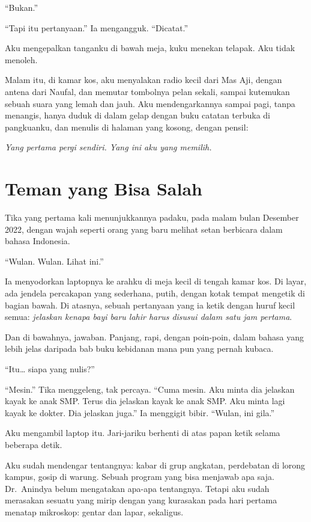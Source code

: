 \documentclass[11pt,twoside,openany]{book}
\begin{document}
``Bukan.''

``Tapi itu pertanyaan.'' Ia mengangguk. ``Dicatat.''

Aku mengepalkan tanganku di bawah meja, kuku menekan telapak. Aku tidak menoleh.

Malam itu, di kamar kos, aku menyalakan radio kecil dari Mas Aji, dengan antena dari Naufal, dan memutar tombolnya pelan sekali, sampai kutemukan sebuah suara yang lemah dan jauh. Aku mendengarkannya sampai pagi, tanpa menangis, hanya duduk di dalam gelap dengan buku catatan terbuka di pangkuanku, dan menulis di halaman yang kosong, dengan pensil:

\emph{Yang pertama pergi sendiri. Yang ini aku yang memilih.}

\chapter{Teman yang Bisa Salah}
Tika yang pertama kali menunjukkannya padaku, pada malam bulan Desember 2022, dengan wajah seperti orang yang baru melihat setan berbicara dalam bahasa Indonesia.

``Wulan. Wulan. Lihat ini.''

Ia menyodorkan laptopnya ke arahku di meja kecil di tengah kamar kos. Di layar, ada jendela percakapan yang sederhana, putih, dengan kotak tempat mengetik di bagian bawah. Di atasnya, sebuah pertanyaan yang ia ketik dengan huruf kecil semua: \emph{jelaskan kenapa bayi baru lahir harus disusui dalam satu jam pertama}.

Dan di bawahnya, jawaban. Panjang, rapi, dengan poin-poin, dalam bahasa yang lebih jelas daripada bab buku kebidanan mana pun yang pernah kubaca.

``Itu\ldots{} siapa yang nulis?''

``Mesin.'' Tika menggeleng, tak percaya. ``Cuma mesin. Aku minta dia jelaskan kayak ke anak SMP. Terus dia jelaskan kayak ke anak SMP. Aku minta lagi kayak ke dokter. Dia jelaskan juga.'' Ia menggigit bibir. ``Wulan, ini gila.''

Aku mengambil laptop itu. Jari-jariku berhenti di atas papan ketik selama beberapa detik.

Aku sudah mendengar tentangnya: kabar di grup angkatan, perdebatan di lorong kampus, gosip di warung. Sebuah program yang bisa menjawab apa saja. Dr.~Anindya belum mengatakan apa-apa tentangnya. Tetapi aku sudah merasakan sesuatu yang mirip dengan yang kurasakan pada hari pertama menatap mikroskop: gentar dan lapar, sekaligus.
\end{document}
